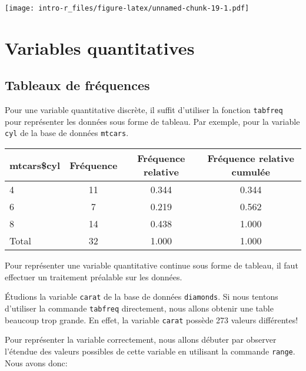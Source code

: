 \documentclass[]{book}
\newenvironment{Shaded}{\begin{snugshade}}{\end{snugshade}}
\newcommand{\KeywordTok}[1]{\textcolor[rgb]{0.13,0.29,0.53}{\textbf{#1}}}
\newcommand{\OperatorTok}[1]{\textcolor[rgb]{0.81,0.36,0.00}{\textbf{#1}}}
\newcommand{\NormalTok}[1]{#1}
\begin{document}
\texttt{[image: intro-r\_files/figure-latex/unnamed-chunk-19-1.pdf]}

\section{Variables quantitatives}\label{variables-quantitatives-1}

\subsection{Tableaux de fréquences}\label{freqquantitatives}

Pour une variable quantitative discrète, il suffit d'utiliser la
fonction \texttt{tabfreq} pour représenter les données sous forme de
tableau. Par exemple, pour la variable \texttt{cyl} de la base de
données \texttt{mtcars}.

\begin{Shaded}
\end{Shaded}

\begin{tabular}{l|c|c|c}
\hline
mtcars\$cyl & Fréquence & Fréquence relative & Fréquence relative cumulée\\
\hline
4 & 11 & 0.344 & 0.344\\
\hline
6 & 7 & 0.219 & 0.562\\
\hline
8 & 14 & 0.438 & 1.000\\
\hline
Total & 32 & 1.000 & 1.000\\
\hline
\end{tabular}

Pour représenter une variable quantitative continue sous forme de
tableau, il faut effectuer un traitement préalable sur les données.

Étudions la variable \texttt{carat} de la base de données
\texttt{diamonds}. Si nous tentons d'utiliser la commande
\texttt{tabfreq} directement, nous allons obtenir une table beaucoup
trop grande. En effet, la variable \texttt{carat} possède 273 valeurs
différentes!

Pour représenter la variable correctement, nous allons débuter par
observer l'étendue des valeurs possibles de cette variable en utilisant
la commande \texttt{range}. Nous avons donc:

\begin{Shaded}
\end{Shaded}
\end{document}
